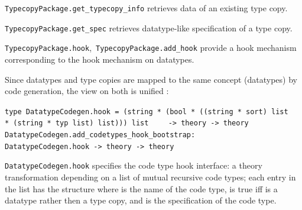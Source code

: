 \begin{isabellebody}
\begin{isamarkuptext}
\begin{description}
  \item \verb|TypecopyPackage.get_typecopy_info| retrieves
     data of an existing type copy.

  \item \verb|TypecopyPackage.get_spec| retrieves datatype-like
     specification of a type copy.

  \item \verb|TypecopyPackage.hook|,~\verb|TypecopyPackage.add_hook|
     provide a hook mechanism corresponding to the hook mechanism
     on datatypes.

  \end{description}%
\end{isamarkuptext}%
\isamarkuptrue%
%
\endisatagmlref
{\isafoldmlref}%
%
\isadelimmlref
%
\endisadelimmlref
%
\isamarkuptrue%
%
\begin{isamarkuptext}%
Since datatypes and type copies are mapped to the same concept (datatypes)
  by code generation, the view on both is unified :%
\end{isamarkuptext}%
\isamarkuptrue%
%
\isadelimmlref
%
\endisadelimmlref
%
\isatagmlref
%
\begin{isamarkuptext}%
\begin{mldecls}
  \verb|type DatatypeCodegen.hook = (string * (bool * ((string * sort) list|\isasep\isanewline%
\verb|    * (string * typ list) list))) list|\isasep\isanewline%
\verb|    -> theory -> theory| \\
  \verb|DatatypeCodegen.add_codetypes_hook_bootstrap: |\isasep\isanewline%
\verb|      DatatypeCodegen.hook -> theory -> theory|
  \end{mldecls}%
\end{isamarkuptext}%
\isamarkuptrue%
%
\endisatagmlref
{\isafoldmlref}%
%
\isadelimmlref
%
\endisadelimmlref
%
\begin{isamarkuptext}%
\begin{description}

  \item \verb|DatatypeCodegen.hook| specifies the code type hook
     interface: a theory transformation depending on a list of
     mutual recursive code types; each entry in the list
     has the structure 
     where  is the name of the code type, 
     is true iff  is a datatype rather then a type copy,
     and  is the specification of the code type.


\end{description}
\end{isamarkuptext}
\end{isabellebody}
